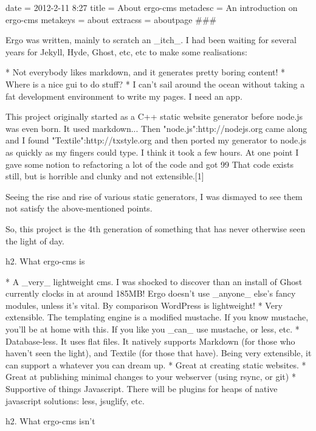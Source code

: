 date = 2012-2-11 8:27
title = About ergo-cms
metadesc = An introduction on ergo-cms
metakeys = about
extracss = aboutpage
###

Ergo was written, mainly to scratch an _itch_. I had been waiting for several years for Jekyll, Hyde, Ghost, etc, etc to make some realisations:

* Not everybody likes markdown, and it generates pretty boring content!
* Where is a nice gui to do stuff?
* I can't sail around the ocean without taking a fat development environment to write my pages. I need an app.

This project originally started as a C++ static website generator before node.js was even born. It used markdown... 
Then "node.js":http://nodejs.org came along and I found "Textile":http://txstyle.org and then ported my generator to node.js as quickly as my fingers could type. I think it took a few hours. 
At one point I gave some notion to refactoring a lot of the code and got 99%
That code exists still, but is horrible and clunky and not extensible.[1]

Seeing the rise and rise of various static generators, I was dismayed to see them not satisfy the above-mentioned points.

So, this project is the 4th generation of something that has never otherwise seen the light of day.


h2. What ergo-cms is

* A _very_ lightweight cms. I was shocked to discover than an install of Ghost currently clocks in at around 185MB! Ergo doesn't use _anyone_ else's fancy modules, unless it's vital. By comparison WordPress is lightweight!
* Very extensible. The templating engine is a modified mustache. If you know mustache, you'll be at home with this. If you like you _can_ use mustache, or less, etc.
* Database-less. It uses flat files. It natively supports Markdown (for those who haven't seen the light), and Textile (for those that have). Being very extensible, it can support a whatever you can dream up.
* Great at creating static websites. 
* Great at publishing minimal changes to your webserver (using rsync, or git)
* Supportive of things Javascript. There will be plugins for heaps of native javascript solutions: less, jsuglify, etc.

h2. What ergo-cms isn't

